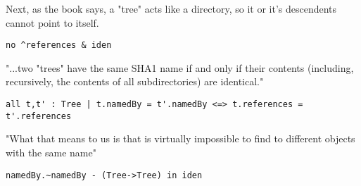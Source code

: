 
Next, as the book \cite{gitComm} says, a "tree" acts
like a directory, so it or it's descendents cannot point
to itself.

\begin{lstlisting}
no ^references & iden 
\end{lstlisting}

"...two "trees" have the same SHA1 name if and only if their
contents (including, recursively, the contents of all subdirectories)
are identical."

\begin{lstlisting}
all t,t' : Tree | t.namedBy = t'.namedBy <=> t.references = t'.references
\end{lstlisting}

"What that means to us is that is virtually impossible to find to 
different objects with the same name"

\begin{lstlisting}
namedBy.~namedBy - (Tree->Tree) in iden
\end{lstlisting}


